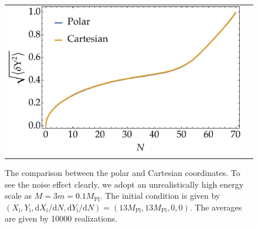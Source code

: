 \documentclass[aps, prd
, preprint
, nofootinbib 
]{revtex4-1}
\newcommand{\dd}{\mathrm{d}}
\newcommand{\Mpl}{M_\text{Pl}}
\begin{document}
\begin{figure}
\begin{tabular}{cc}
\begin{minipage}{0.5\hsize}
		\end{minipage}
		\begin{minipage}{0.5\hsize}
			\centering
			\includegraphics[width=\hsize]{figs/stdY.pdf}
		\end{minipage}
	\end{tabular}
	\caption{The comparison between the polar and Cartesian coordinates. To see the noise effect clearly, we adopt 
	an unrealistically high energy scale as $M=3m=0.1\Mpl$. The initial condition is given by $(X_\text{i},Y_\text{i},\dd X_\text{i}/\dd N,\dd Y_\text{i}/\dd N)
	=(13\Mpl,13\Mpl,0,0)$. The averages are given by 10000 realizations.}
	\label{fig: CvsP}
\end{figure}
		
			
\end{document}
